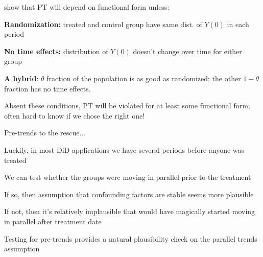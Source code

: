\documentclass[aspectratio = 169, 13pt]{beamer}
\begin{document}
\begin{frame}{}
	
	\citet{roth_when_2023} show that PT will depend on functional form unless: \medskip 
	\begin{wideitemize}
		\item
		\textbf{Randomization:} treated and control group have same dist. of $Y(0)$ in each period
		
		\item
		\textbf{No time effects:} distribution of $Y(0)$ doesn't change over time for either group
		
		\item
		\textbf{A hybrid}: $\theta$ fraction of the population is as good as randomized; the other $1-\theta$ fraction has no time effects. 
	\end{wideitemize}
\bigskip 
Absent these conditions, PT will be violated for at least some functional form; often hard to know if we chose the right one!
\end{frame}


\begin{frame}{Pre-trends to the rescue...}
	\begin{wideitemize}
		\item
		Luckily, in most DiD applications we have several periods before anyone was treated
		
		\item
		We can test whether the groups were moving in parallel prior to the treatment
			\begin{wideitemize}
				\item
				If so, then assumption that confounding factors are stable seems more plausible
				
				\item
				If not, then it's relatively implausible that would have magically started moving in parallel after treatment date
			\end{wideitemize}
		
		\item
		Testing for pre-trends provides a natural plausibility check on the parallel trends assumption
	\end{wideitemize}
\end{frame}
\end{document}
